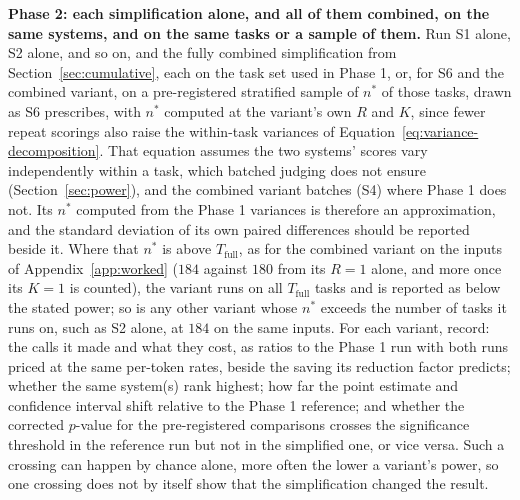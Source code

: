 \documentclass[11pt]{article}
\begin{document}
\textbf{Phase 2: each simplification alone, and all of them combined, on the same systems, and on the same tasks or a sample of them.} Run
S1 alone, S2 alone, and so on, and the fully combined simplification from
Section~\ref{sec:cumulative}, each on the task set used in Phase 1, or, for S6 and the combined variant, on a pre-registered stratified sample of $n^*$ of those tasks, drawn as S6 prescribes, with $n^*$ computed at the variant's own $R$ and $K$, since fewer repeat scorings also raise the within-task variances of Equation~\ref{eq:variance-decomposition}. That equation assumes the two systems' scores vary independently within a task, which batched judging does not ensure (Section~\ref{sec:power}), and the combined variant batches (S4) where Phase 1 does not. Its $n^*$ computed from the Phase 1 variances is therefore an approximation, and the standard deviation of its own paired differences should be reported beside it. Where that $n^*$ is above $T_{\text{full}}$, as for the combined variant on the inputs of Appendix~\ref{app:worked} ($184$ against $180$ from its $R = 1$ alone, and more once its $K = 1$ is counted), the variant runs on all $T_{\text{full}}$ tasks and is reported as below the stated power; so is any other variant whose $n^*$ exceeds the number of tasks it runs on, such as S2 alone, at $184$ on the same inputs. For
each variant, record: the calls it made and what they cost, as ratios to the Phase 1 run with both runs priced at the same per-token rates, beside the saving its reduction factor predicts; whether the same system(s) rank highest; how far the point estimate
and confidence interval shift relative to the Phase 1 reference; and whether the corrected
$p$-value for the pre-registered comparisons crosses the significance threshold in the
reference run but not in the simplified one, or vice versa. Such a crossing can happen by chance alone, more often the lower a variant's power, so one crossing does not by itself show that the simplification changed the result.
\end{document}
